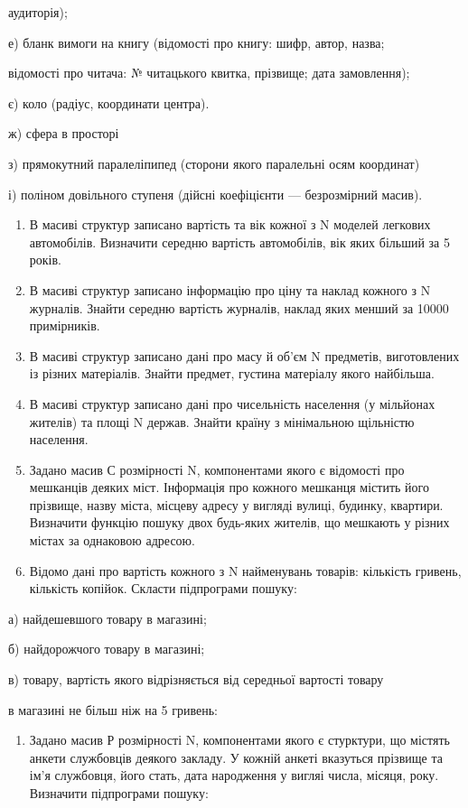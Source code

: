 \documentclass[]{article}
\begin{document}
аудиторія);

е) бланк вимоги на книгу (відомості про книгу: шифр, автор, назва;

відомості про читача: № читацького квитка, прізвище; дата замовлення);

є) коло (радіус, координати центра).

ж) \protect\hypertarget{_Hlk65237605}{}{}сфера в просторі

з) прямокутний паралеліпипед (сторони якого паралельні осям координат)

і) поліном довільного ступеня (дійсні коефіцієнти --- безрозмірний
масив).

\begin{enumerate}
\def\labelenumi{\arabic{enumi})}
\setcounter{enumi}{6}
\item
  В масиві структур записано вартість та вік кожної з N моделей легкових
  автомобілів. Визначити середню вартість автомобілів, вік яких більший
  за 5 років.
\item
  В масиві структур записано інформацію про ціну та наклад кожного з N
  журналів. Знайти середню вартість журналів, наклад яких менший за
  10000 примірників.
\item
  В масиві структур записано дані про масу й об'єм N предметів,
  виготовлених із різних матеріалів. Знайти предмет, густина матеріалу
  якого найбільша.
\item
  В масиві структур записано дані про чисельність населення (у мільйонах
  жителів) та площі N держав. Знайти країну з мінімальною щільністю
  населення.
\item
  Задано масив С розмірності N, компонентами якого є відомості про
  мешканців деяких міст. Інформація про кожного мешканця містить його
  прізвище, назву міста, місцеву адресу у вигляді вулиці, будинку,
  квартири. Визначити функцію пошуку двох будь-яких жителів, що мешкають
  у різних містах за однаковою адресою.
\item
  Відомо дані про вартість кожного з N найменувань товарів: кількість
  гривень, кількість копійок. Скласти підпрограми пошуку:
\end{enumerate}

а) найдешевшого товару в магазині;

б) найдорожчого товару в магазині;

в) товару, вартість якого відрізняється від середньої вартості товару

в магазині не більш ніж на 5 гривень:

\begin{enumerate}
\def\labelenumi{\arabic{enumi})}
\setcounter{enumi}{6}
\item
  Задано масив Р розмірності N, компонентами якого є стурктури, що
  містять анкети службовців деякого закладу. У кожній анкеті вказуться
  прізвище та ім'я службовця, його стать, дата народження у вигляі
  числа, місяця, року. Визначити підпрограми пошуку:
\end{enumerate}
\end{document}
